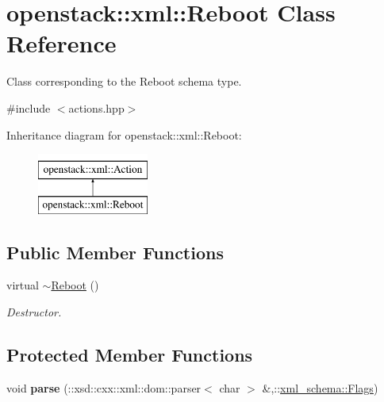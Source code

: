 \hypertarget{classopenstack_1_1xml_1_1Reboot}{
\section{openstack::xml::Reboot Class Reference}
\label{classopenstack_1_1xml_1_1Reboot}
}


Class corresponding to the Reboot schema type.  




{\ttfamily \#include $<$actions.hpp$>$}

Inheritance diagram for openstack::xml::Reboot:\begin{figure}[H]
\begin{center}
\leavevmode
\includegraphics[height=2.000000cm]{classopenstack_1_1xml_1_1Reboot}
\end{center}
\end{figure}
\subsection*{Public Member Functions}
\begin{DoxyCompactItemize}
\item 
\hypertarget{classopenstack_1_1xml_1_1Reboot_a6caa16d882a81ac97fcff791e5636861}{
virtual \hyperlink{classopenstack_1_1xml_1_1Reboot_a6caa16d882a81ac97fcff791e5636861}{$\sim$Reboot} ()}
\label{classopenstack_1_1xml_1_1Reboot_a6caa16d882a81ac97fcff791e5636861}

\begin{DoxyCompactList}\small\item\em Destructor. \item\end{DoxyCompactList}\end{DoxyCompactItemize}
\subsection*{Protected Member Functions}
\begin{DoxyCompactItemize}
\item 
\hypertarget{classopenstack_1_1xml_1_1Reboot_ae1c28999c5169ee4c444ccee3a5b4804}{
void {\bfseries parse} (::xsd::cxx::xml::dom::parser$<$ char $>$ \&,::\hyperlink{namespacexml__schema_affb4c227cbd9aa7453dd1dc5a1401943}{xml\_\-schema::Flags})}
\label{classopenstack_1_1xml_1_1Reboot_ae1c28999c5169ee4c444ccee3a5b4804}

\end{DoxyCompactItemize}
